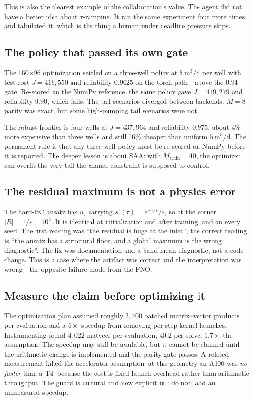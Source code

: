 This is also the clearest example of the collaboration's value. The agent did
not have a better idea about $\tau$-ramping. It ran the same experiment four more
times and tabulated it, which is the thing a human under deadline pressure
skips.

\subsection{The policy that passed its own gate}
\label{sec:fail3well}

The 160$\times$96 optimization settled on a three-well policy at
$5\ \mathrm{m^3/d}$ per well with test cost $J=419{,}550$ and reliability
$0.9625$ on the torch path---above the $0.94$ gate. Re-scored on the NumPy
reference, the same policy gave $J=419{,}279$ and reliability $0.90$, which
fails. The tail scenarios diverged between backends: $M=8$ parity was exact,
but some high-pumping tail scenarios were not.

The robust frontier is four wells at $J=437{,}964$ and reliability $0.975$,
about 4\% more expensive than three wells and still 16\% cheaper than uniform
$5\ \mathrm{m^3/d}$. The permanent rule is that any three-well policy must be
re-scored on NumPy before it is reported. The deeper lesson is about SAA: with
$M_{\text{train}}=40$, the optimizer can overfit the very tail the chance
constraint is supposed to control.

\subsection{The residual maximum is not a physics error}
\label{sec:failres}

The hard-BC ansatz has $u_\tau$ carrying $s'(\tau)=e^{-\tau/\varepsilon}/
\varepsilon$, so at the corner $|R|=1/\varepsilon=10^{3}$. It is identical at
initialization and after training, and on every seed. The first reading was
``the residual is huge at the inlet''; the correct reading is ``the ansatz has a
structural floor, and a global maximum is the wrong diagnostic''. The fix was
documentation and a band-mean diagnostic, not a code change. This is a case
where the artifact was correct and the interpretation was wrong---the opposite
failure mode from the FNO.

\subsection{Measure the claim before optimizing it}
\label{sec:failcost}

The optimization plan assumed roughly $2{,}400$ batched matrix--vector products
per evaluation and a $5\times$ speedup from removing per-step kernel launches.
Instrumenting  found $4{,}022$ matvecs per evaluation,
$40.2$ per solve, $1.7\times$ the assumption. The speedup may still be available,
but it cannot be claimed until the arithmetic change is implemented and the
parity gate passes. A related measurement killed the accelerator assumption: at
this geometry an A100 was \emph{no faster} than a T4, because the cost is fixed
launch overhead rather than arithmetic throughput. The guard is cultural and now
explicit in : do not land an unmeasured speedup.
